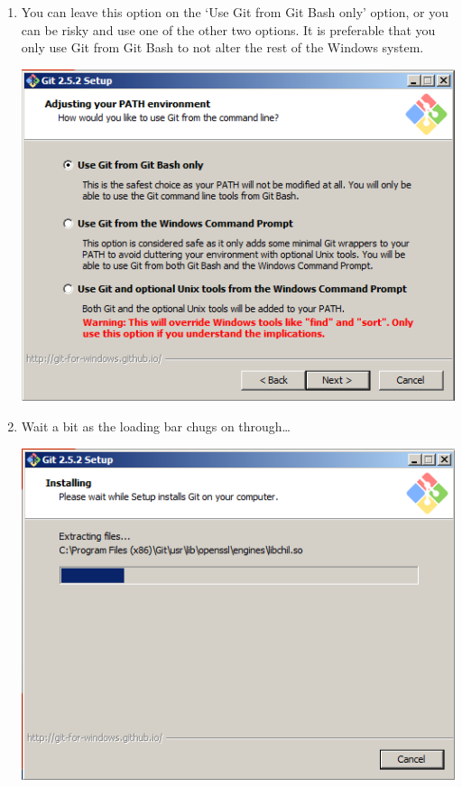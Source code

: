 \documentclass[11pt,fleqn]{article}
\theoremstyle{definition}
\begin{document}
\begin{enumerate}[Step 1.]
\item You can leave this option on the `Use Git from Git Bash only' option, or
    you can be risky and use one of the other two options. It is preferable that
    you only use Git from Git Bash to not alter the rest of the Windows system.
\begin{center}
\includegraphics[scale=0.6]{gitwininstall9.png}
\end{center}

\newpage
\item Wait a bit as the loading bar chugs on through\ldots
\begin{center}
\includegraphics[scale=0.6]{gitwininstall10.png}
\end{center}


\end{enumerate}
\end{document}
